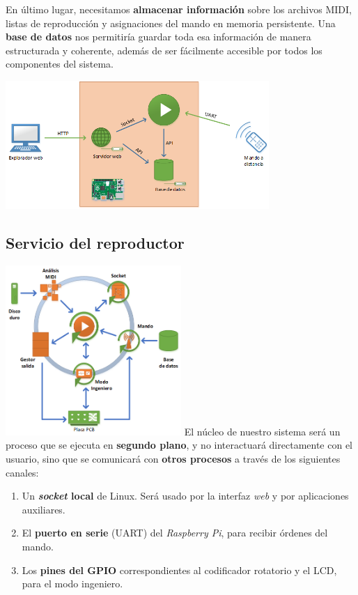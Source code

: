 \documentclass[10pt,a4paper]{article}
\begin{document}
	En último lugar, necesitamos \textbf{almacenar información} sobre los archivos MIDI, listas de reproducción y asignaciones del mando en memoria persistente. Una \textbf{base de datos} nos permitiría guardar toda esa información de manera estructurada y coherente, además de ser fácilmente accesible por todos los componentes del sistema.
		
	\begin{center}
		\includegraphics[width=0.75\textwidth]{images/general}
	\end{center}
	
	\clearpage
	\subsection{Servicio del reproductor}
	
	\begin{multicols}{2}
		\noindent
		\includegraphics[width=0.5\textwidth]{images/reproductor} 
		\columnbreak
		El núcleo de nuestro sistema será un proceso que se ejecuta en \textbf{segundo plano}, y no interactuará directamente con el usuario, sino que se comunicará con \textbf{otros procesos} a través de los siguientes canales:
		
		\begin{enumerate}
			\item Un \textbf{\textit{socket} local} de Linux. Será usado  por la interfaz \textit{web} y por aplicaciones auxiliares.
			
			\item El \textbf{puerto en serie} (UART) del \textit{Raspberry Pi}, para recibir órdenes del mando.
			
			\item Los \textbf{pines del GPIO} correspondientes al codificador rotatorio y el LCD, para el modo ingeniero.
		\end{enumerate}
	\end{multicols}
	
\end{document}

